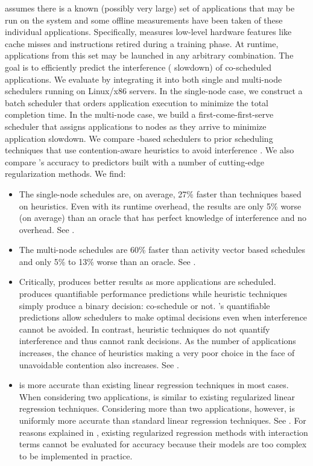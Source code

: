 \SYSTEMESP{} assumes there is a known (possibly very large) set of
applications that may be run on the system and some offline
measurements have been taken of these individual applications.
Specifically, \SYSTEMESP{} measures low-level hardware features like
cache misses and instructions retired during a training phase.  At
runtime, applications from this set may be launched in any arbitrary
combination.  The goal is to efficiently predict the interference (\ie
slowdown) of co-scheduled applications.
We evaluate \SYSTEMESP{} by integrating it into both single and
multi-node schedulers running on Linux/x86 servers.  In the
single-node case, we construct a batch scheduler that orders
application execution to minimize the total completion time.  In the
multi-node case, we build a first-come-first-serve scheduler that
assigns applications to nodes as they arrive to minimize application
slowdown.  We compare \SYSTEMESP{}-based schedulers to prior scheduling
techniques that use contention-aware heuristics to avoid interference
\cite{resense,merkel2010resource,Merlin}.  We also compare \SYSTEMESP{}'s
accuracy to predictors built with a number of cutting-edge
regularization methods. We find:
\begin{itemize}
\item The single-node \SYSTEMESP{} schedules are, on average, 27\% faster
  than techniques based on heuristics.  Even with its runtime
  overhead, the \SYSTEMESP{} results are only 5\% worse (on average) than
  an oracle that has perfect knowledge of interference and no
  overhead. See .
\item The multi-node \SYSTEMESP{} schedules are 60\% faster than activity
  vector based schedules and only 5\% to 13\% worse than an oracle.
  See .
\item Critically, \SYSTEMESP{} produces better results as more
  applications are scheduled.  \SYSTEMESP{} produces quantifiable
  performance predictions while heuristic techniques simply produce a
  binary decision: co-schedule or not.  \SYSTEMESP{}'s quantifiable
  predictions allow schedulers to make optimal decisions even when
  interference cannot be avoided. In contrast, heuristic techniques do
  not quantify interference and thus cannot rank decisions.  As the
  number of applications increases, the chance of heuristics making a
  very poor choice in the face of unavoidable contention also
  increases.  See .
\item \SYSTEMESP{} is more accurate than existing linear regression
  techniques in most cases.  When considering two applications,
  \SYSTEMESP{} is similar to existing regularized linear regression
  techniques.  Considering more than two applications, however,
  \SYSTEMESP{} is uniformly more accurate than standard linear regression
  techniques.  See .  For reasons explained in
  , existing regularized regression methods with
  interaction terms cannot be evaluated for accuracy because their
  models are too complex to be implemented in practice.
\end{itemize}


